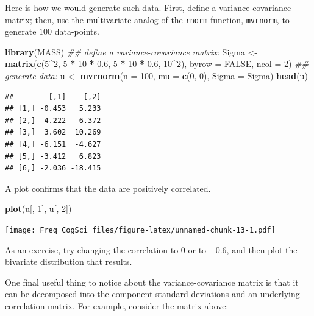 \documentclass[12pt,]{krantz}
\newenvironment{Shaded}{\begin{snugshade}}{\end{snugshade}}
\newcommand{\CommentTok}[1]{\textcolor[rgb]{0.56,0.35,0.01}{\textit{#1}}}
\newcommand{\DataTypeTok}[1]{\textcolor[rgb]{0.13,0.29,0.53}{#1}}
\newcommand{\DecValTok}[1]{\textcolor[rgb]{0.00,0.00,0.81}{#1}}
\newcommand{\FloatTok}[1]{\textcolor[rgb]{0.00,0.00,0.81}{#1}}
\newcommand{\KeywordTok}[1]{\textcolor[rgb]{0.13,0.29,0.53}{\textbf{#1}}}
\newcommand{\NormalTok}[1]{#1}
\newcommand{\OperatorTok}[1]{\textcolor[rgb]{0.81,0.36,0.00}{\textbf{#1}}}
\newcommand{\OtherTok}[1]{\textcolor[rgb]{0.56,0.35,0.01}{#1}}
\newcommand{\StringTok}[1]{\textcolor[rgb]{0.31,0.60,0.02}{#1}}
\begin{document}
Here is how we would generate such data. First, define a variance covariance matrix; then, use the multivariate analog of the \texttt{rnorm} function, \texttt{mvrnorm}, to generate \(100\) data-points.

\begin{Shaded}
\begin{Highlighting}[]
\KeywordTok{library}\NormalTok{(MASS)}
\CommentTok{## define a variance-covariance matrix:}
\NormalTok{Sigma <-}\StringTok{ }\KeywordTok{matrix}\NormalTok{(}\KeywordTok{c}\NormalTok{(}\DecValTok{5}\OperatorTok{^}\DecValTok{2}\NormalTok{, }\DecValTok{5} \OperatorTok{*}\StringTok{ }\DecValTok{10} \OperatorTok{*}\StringTok{ }\FloatTok{0.6}\NormalTok{, }\DecValTok{5} \OperatorTok{*}\StringTok{ }\DecValTok{10} \OperatorTok{*}\StringTok{ }\FloatTok{0.6}\NormalTok{, }
  \DecValTok{10}\OperatorTok{^}\DecValTok{2}\NormalTok{), }\DataTypeTok{byrow =} \OtherTok{FALSE}\NormalTok{, }\DataTypeTok{ncol =} \DecValTok{2}\NormalTok{)}
\CommentTok{## generate data:}
\NormalTok{u <-}\StringTok{ }\KeywordTok{mvrnorm}\NormalTok{(}\DataTypeTok{n =} \DecValTok{100}\NormalTok{, }\DataTypeTok{mu =} \KeywordTok{c}\NormalTok{(}\DecValTok{0}\NormalTok{, }\DecValTok{0}\NormalTok{), }\DataTypeTok{Sigma =}\NormalTok{ Sigma)}
\KeywordTok{head}\NormalTok{(u)}
\end{Highlighting}
\end{Shaded}

\begin{verbatim}
##        [,1]    [,2]
## [1,] -0.453   5.233
## [2,]  4.222   6.372
## [3,]  3.602  10.269
## [4,] -6.151  -4.627
## [5,] -3.412   6.823
## [6,] -2.036 -18.415
\end{verbatim}

A plot confirms that the data are positively correlated.

\begin{Shaded}
\begin{Highlighting}[]
\KeywordTok{plot}\NormalTok{(u[, }\DecValTok{1}\NormalTok{], u[, }\DecValTok{2}\NormalTok{])}
\end{Highlighting}
\end{Shaded}

\texttt{[image: Freq\_CogSci\_files/figure-latex/unnamed-chunk-13-1.pdf]}

As an exercise, try changing the correlation to \(0\) or to \(-0.6\), and then plot the bivariate distribution that results.

One final useful thing to notice about the variance-covariance matrix is that it can be decomposed into the component standard deviations and an underlying correlation matrix. For example, consider the matrix above:
\end{document}
